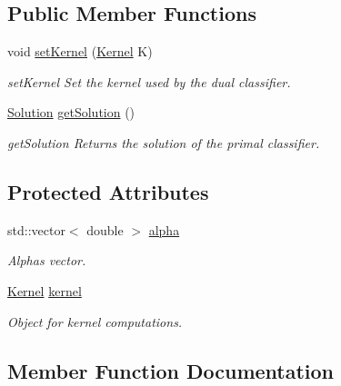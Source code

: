 \subsection*{Public Member Functions}
\begin{DoxyCompactItemize}
\item 
void \hyperlink{class_dual_classifier_a0cf616ad02cfcdd69cfd3d0b35001946}{set\+Kernel} (\hyperlink{class_kernel}{Kernel} K)
\begin{DoxyCompactList}\small\item\em set\+Kernel Set the kernel used by the dual classifier. \end{DoxyCompactList}\item 
\hyperlink{class_solution}{Solution} \hyperlink{class_dual_classifier_a1ecc7089dd9d5456f398e62506f37c14}{get\+Solution} ()
\begin{DoxyCompactList}\small\item\em get\+Solution Returns the solution of the primal classifier. \end{DoxyCompactList}\end{DoxyCompactItemize}
\subsection*{Protected Attributes}
\begin{DoxyCompactItemize}
\item 
\mbox{\label{class_dual_classifier_a0ed1219ed410852620b844934a8c70a0}} 
std\+::vector$<$ double $>$ \hyperlink{class_dual_classifier_a0ed1219ed410852620b844934a8c70a0}{alpha}
\begin{DoxyCompactList}\small\item\em Alphas vector. \end{DoxyCompactList}\item 
\mbox{\label{class_dual_classifier_a710addb26d481a0b7b60e37e537c2290}} 
\hyperlink{class_kernel}{Kernel} \hyperlink{class_dual_classifier_a710addb26d481a0b7b60e37e537c2290}{kernel}
\begin{DoxyCompactList}\small\item\em Object for kernel computations. \end{DoxyCompactList}\end{DoxyCompactItemize}


\subsection{Member Function Documentation}
\mbox{\label{class_dual_classifier_a1ecc7089dd9d5456f398e62506f37c14}} 
